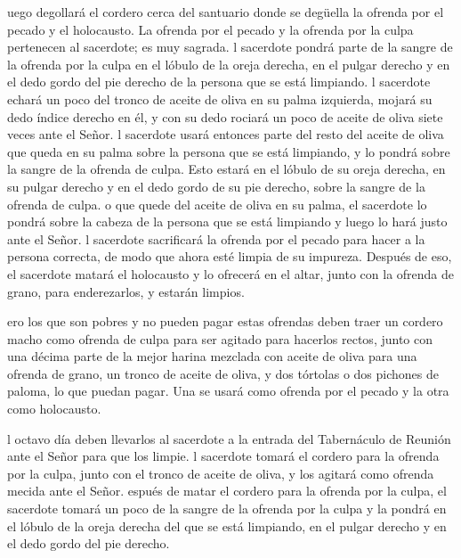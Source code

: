  uego degollará el cordero cerca del santuario donde se
degüella la ofrenda por el pecado y el holocausto. La ofrenda por el
pecado y la ofrenda por la culpa pertenecen al sacerdote; es muy
sagrada.  l sacerdote pondrá parte de la sangre de la
ofrenda por la culpa en el lóbulo de la oreja derecha, en el pulgar
derecho y en el dedo gordo del pie derecho de la persona que se está
limpiando.  l sacerdote echará un poco del tronco de aceite
de oliva en su palma izquierda,  mojará su dedo índice
derecho en él, y con su dedo rociará un poco de aceite de oliva siete
veces ante el Señor.  l sacerdote usará entonces parte del
resto del aceite de oliva que queda en su palma sobre la persona que se
está limpiando, y lo pondrá sobre la sangre de la ofrenda de culpa. Esto
estará en el lóbulo de su oreja derecha, en su pulgar derecho y en el
dedo gordo de su pie derecho, sobre la sangre de la ofrenda de culpa.
 o que quede del aceite de oliva en su palma, el sacerdote
lo pondrá sobre la cabeza de la persona que se está limpiando y luego lo
hará justo ante el Señor.  l sacerdote sacrificará la
ofrenda por el pecado para hacer a la persona correcta, de modo que
ahora esté limpia de su impureza. Después de eso, el sacerdote matará el
holocausto  y lo ofrecerá en el altar, junto con la ofrenda
de grano, para enderezarlos, y estarán limpios.

 ero los que son pobres y no pueden pagar estas ofrendas
deben traer un cordero macho como ofrenda de culpa para ser agitado para
hacerlos rectos, junto con una décima parte de la mejor harina mezclada
con aceite de oliva para una ofrenda de grano, un tronco de aceite de
oliva,  y dos tórtolas o dos pichones de paloma, lo que
puedan pagar. Una se usará como ofrenda por el pecado y la otra como
holocausto.

 l octavo día deben llevarlos al sacerdote a la entrada del
Tabernáculo de Reunión ante el Señor para que los limpie. 
l sacerdote tomará el cordero para la ofrenda por la culpa, junto con el
tronco de aceite de oliva, y los agitará como ofrenda mecida ante el
Señor.  espués de matar el cordero para la ofrenda por la
culpa, el sacerdote tomará un poco de la sangre de la ofrenda por la
culpa y la pondrá en el lóbulo de la oreja derecha del que se está
limpiando, en el pulgar derecho y en el dedo gordo del pie derecho.

